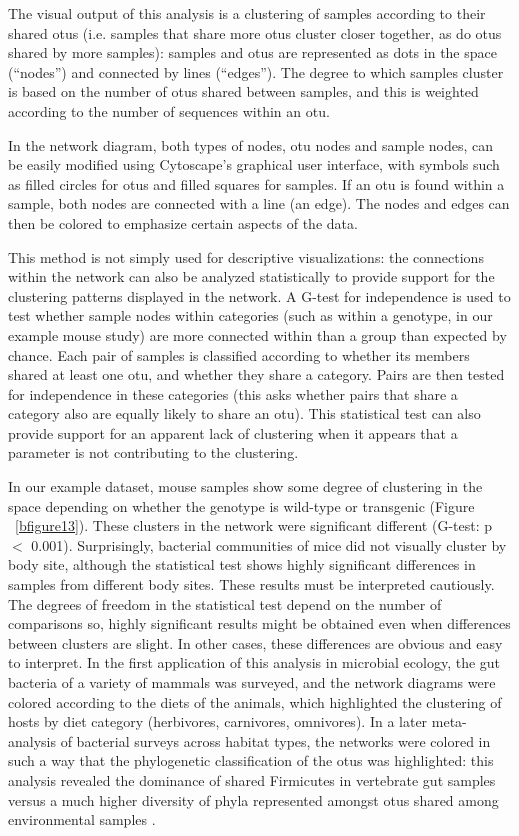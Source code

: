 The visual output of this analysis is a clustering of samples according to their shared \gls{otu}s
(i.e. samples that share more \gls{otu}s cluster closer together, as do \gls{otu}s shared by more samples):
samples and \gls{otu}s are represented as dots in the space (“nodes”) and connected by lines (“edges”).
The degree to which samples cluster is based on the number of \gls{otu}s shared between samples, and this
is weighted according to the number of sequences within an \gls{otu}.

In the network diagram, both types of nodes, \gls{otu} nodes and sample nodes, can be
easily modified using Cytoscape's graphical user interface, with symbols such as
filled circles for \gls{otu}s and filled squares for samples. If an \gls{otu} is found within a
sample, both nodes are connected with a line (an edge). The nodes and edges can then
be colored to emphasize certain aspects of the data.

This method is not simply used for descriptive visualizations: the connections within
the network can also be analyzed statistically to provide support for the clustering patterns
displayed in the network. A G-test for independence is used to test whether sample nodes within
categories (such as within a genotype, in our example mouse study) are more connected within
than a group than expected by chance. Each pair of samples is classified according to whether
its members shared at least one \gls{otu}, and whether they share a category. Pairs are then
tested for independence in these categories (this asks whether pairs that share a category
also are equally likely to share an \gls{otu}). This statistical test can also provide support
for an apparent lack of clustering when it appears that a parameter is not contributing
to the clustering.

In our example dataset, mouse samples show some degree of clustering in the space
depending on whether the genotype is wild-type or transgenic (Figure ~\ref{bfigure13}).
These clusters in the network were significant different (G-test: p $<$ 0.001). Surprisingly,
bacterial communities of mice did not visually cluster by body site, although the statistical
test shows highly significant differences in samples from different body sites. These results
must be interpreted cautiously. The degrees of freedom in the statistical test depend on the
number of comparisons so, highly significant results might be obtained even when differences
between clusters are slight. In other cases, these differences are obvious and easy to interpret.
In the first application of this analysis in microbial ecology, the gut bacteria of a variety of
mammals was surveyed, and the network diagrams were colored according to the diets of the animals,
which highlighted the clustering of hosts by diet category (herbivores, carnivores, omnivores). In a
later meta-analysis of bacterial surveys across habitat types, the networks were colored in such a
way that the phylogenetic classification of the \gls{otu}s was highlighted: this analysis revealed
the dominance of shared Firmicutes in vertebrate gut samples versus a much higher diversity of
phyla represented amongst \gls{otu}s shared among environmental samples \cite{Ley2008}.

